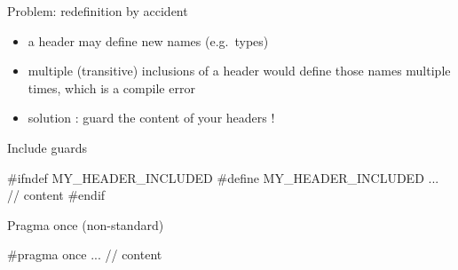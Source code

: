 \begin{frame}[fragile]
  \begin{block}{Problem: redefinition by accident}
    \begin{itemize}
      \item a header may define new names (e.g.\ types)
      \item multiple (transitive) inclusions of a header would define those names multiple times, which is a compile error
      \item solution : guard the content of your headers !
    \end{itemize}
  \end{block}
  \begin{block}{Include guards}
    \begin{cppcode*}{}
      #ifndef MY_HEADER_INCLUDED
      #define MY_HEADER_INCLUDED
      ... // content
      #endif
    \end{cppcode*}
  \end{block}
  \begin{block}{Pragma once (non-standard)}
    \begin{cppcode*}{}
      #pragma once
      ... // content
    \end{cppcode*}
  \end{block}
\end{frame}
